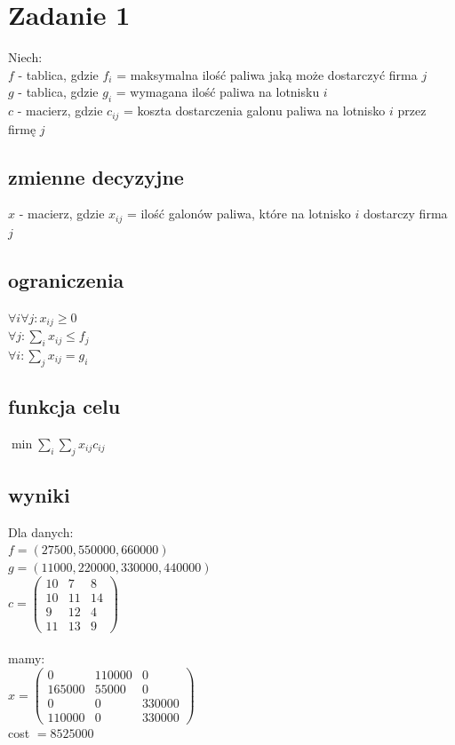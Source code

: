 \documentclass{report}
\begin{document}
\author{Jakub Ogrodowczyk}

\section*{Zadanie 1}
Niech:\\
$f$ - tablica, gdzie
$f_i$ = maksymalna ilość paliwa jaką może dostarczyć firma $j$\\
$g$ - tablica, gdzie
$g_i$ = wymagana ilość paliwa na lotnisku $i$\\
$c$ - macierz, gdzie
$c_{ij}$ = koszta dostarczenia galonu paliwa na lotnisko $i$ przez firmę $j$
\subsection*{zmienne decyzyjne}
\(x\) - macierz, gdzie
\(x_{ij}\) = ilość galonów paliwa, które na lotnisko \(i\) dostarczy firma \(j\)
\subsection*{ograniczenia}
$\forall i \forall j : x_{ij} \ge 0$\\
$\forall j : \sum_{i} x_{ij} \le f_j$\\
$\forall i : \sum_{j} x_{ij} = g_i$
\subsection*{funkcja celu}
$\min \sum_{i} \sum_{j} x_{ij} c_{ij}$
\subsection*{wyniki}
Dla danych:\\
$f = (27500, 550000, 660000)$\\
$g = (11000, 220000, 330000, 440000)$\\
$c = \begin{pmatrix}
    10 & 7 & 8 \\
    10 & 11 & 14 \\
    9 & 12 & 4 \\
    11 & 13 & 9
    \end{pmatrix}$\\\\
mamy:\\
$x = \begin{pmatrix}
0 & 110000 & 0 \\
165000 & 55000 & 0 \\
0 & 0 & 330000 \\
110000 & 0 & 330000
\end{pmatrix}$\\
cost $= 8525000$
\end{document}
